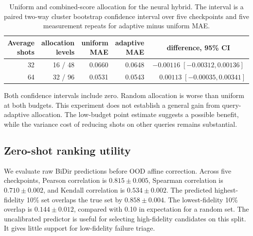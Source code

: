 \documentclass[10pt]{article}
\begin{document}
\begin{table}[h]
\centering
\caption{Uniform and combined-score allocation for the neural hybrid. The interval is a paired two-way cluster bootstrap confidence interval over five checkpoints and five measurement repeats for adaptive minus uniform MAE.}
\label{tab:supp_adaptive}
\begin{tabular}{rrrrc}
\toprule
Average shots & allocation levels & uniform MAE & adaptive MAE & difference, 95\% CI \\
\midrule
32 & 16 / 48 & 0.0660 & 0.0648 & $-0.00116\;[-0.00312,0.00136]$ \\
64 & 32 / 96 & 0.0531 & 0.0543 & $\phantom{-}0.00113\;[-0.00035,0.00341]$ \\
\bottomrule
\end{tabular}
\end{table}

Both confidence intervals include zero. Random allocation is worse than uniform at both budgets. This experiment does not establish a general gain from query-adaptive allocation. The low-budget point estimate suggests a possible benefit, while the variance cost of reducing shots on other queries remains substantial.

\subsection{Zero-shot ranking utility}
We evaluate raw BiDir predictions before OOD affine correction. Across five checkpoints, Pearson correlation is $0.815\pm0.005$, Spearman correlation is $0.710\pm0.002$, and Kendall correlation is $0.534\pm0.002$. The predicted highest-fidelity 10\% set overlaps the true set by $0.858\pm0.004$. The lowest-fidelity 10\% overlap is $0.144\pm0.012$, compared with 0.10 in expectation for a random set. The uncalibrated predictor is useful for selecting high-fidelity candidates on this split. It gives little support for low-fidelity failure triage.
\end{document}
